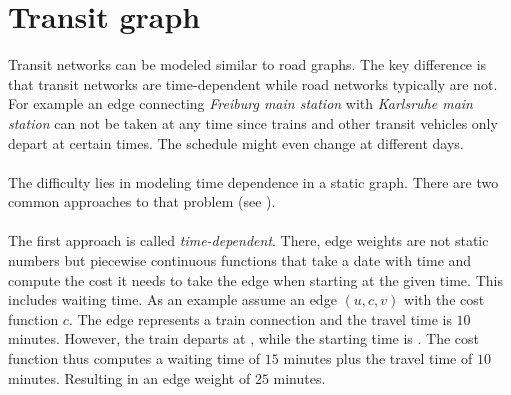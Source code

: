 \section{Transit graph}\label{transitGraph}
	Transit networks can be modeled similar to road graphs. The key difference is that transit networks are time-dependent
	while road networks typically are not. For example an edge connecting \textit{Freiburg main station} with \textit{Karlsruhe main station}
	can not be taken at any time since trains and other transit vehicles only depart at certain times. The schedule might even change
	at different days.\\\\
	The difficulty lies in modeling time dependence in a static graph. There are two common approaches to that problem
	(see ).\\\\
	The first approach is called \textit{time-dependent}. There, edge weights are not static numbers but piecewise
	continuous functions that take a date with time and compute the cost it needs to take the edge when starting at the given time.
	This includes waiting time. As an example assume an edge $(u, c, v)$ with the cost function $c$. The edge represents a
	train connection and the travel time is $10$ minutes. However, the train departs at , while the starting time
	is . The cost function thus computes a waiting time of $15$ minutes plus the travel time of $10$ minutes.
	Resulting in an edge weight of $25$ minutes.
	
